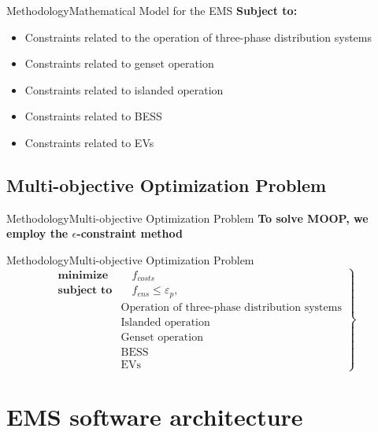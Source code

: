 \documentclass[10pt, aspectratio=1610]{beamer}
\begin{document}
\begin{frame}{Methodology}{Mathematical Model for the EMS}
    \textbf{Subject to:} 

    \begin{itemize}%
        \item Constraints related to the operation of three-phase distribution 
        systems
        \item Constraints related to genset operation
        \item Constraints related to islanded operation
        \item Constraints related to BESS
        \item Constraints related to EVs
    \end{itemize}
\end{frame}

\subsection{Multi-objective Optimization Problem}

\begin{frame}{Methodology}{Multi-objective Optimization Problem}
    \textbf{To solve MOOP, we employ the $\epsilon$-constraint method}
\end{frame}

\begin{frame}{Methodology}{Multi-objective Optimization Problem}
    \begin{equation}
        \left.
        \begin{aligned}
        \textbf{minimize} &\quad \text{$f_{costs}$}\\
        \textbf{subject to}&\quad \text{$f_{ens}$} \leq \text{$\varepsilon_{p}$},\\
        &\text{Operation of three-phase distribution 
        systems}\\
        &\text{Islanded operation}\\
        &\text{Genset operation}\\
        &\text{BESS} \\
        &\text{EVs}
        \end{aligned}
        \right\}
        \label{final_equation}
    \end{equation}
\end{frame}

\section{EMS software architecture}
\end{document}
